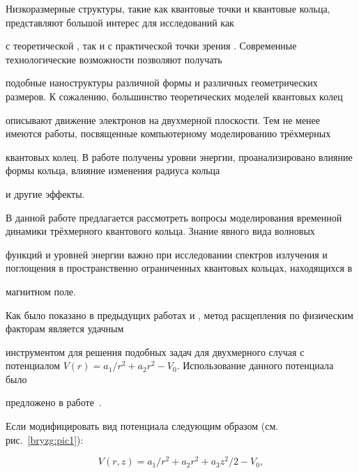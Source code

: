 \maketitle





 Низкоразмерные структуры, такие как квантовые точки и квантовые кольца, представляют большой интерес для исследований как

с теоретической \cite{Viefers}, так и с практической точки зрения \cite{Timm}. Современные технологические возможности позволяют получать

подобные наноструктуры различной формы и различных геометрических размеров. К сожалению, большинство теоретических моделей квантовых колец

описывают движение электронов на двухмерной плоскости. Тем не менее имеются работы, посвященные компьютерному моделированию трёхмерных

квантовых колец. В работе \cite{Voskoboynikov} получены уровни энергии, проанализировано влияние формы кольца, влияние изменения радиуса кольца

и другие эффекты.



В данной работе предлагается рассмотреть вопросы моделирования временной динамики трёхмерного квантового кольца. Знание явного вида волновых

функций и уровней энергии важно при исследовании спектров излучения и поглощения в пространственно ограниченных квантовых кольцах, находящихся в

магнитном поле.



Как было показано в предыдущих работах \cite{Bryzgalov1} и \cite{Bryzgalov2}, метод расщепления по физическим факторам является удачным

инструментом для решения подобных задач для двухмерного случая с потенциалом $V(r)= a_1/r^2+a_2r^2-V_0$. Использование данного потенциала было

предложено в работе~\cite{TanInkson}. 

Если модифицировать вид потенциала следующим образом (см. рис.~\ref{bryzg:pic1}):

\begin{equation}

\label{potential} V(r,z)=a_1/r^2+a_2r^2+a_3z^2/2-V_0,

\end{equation}

